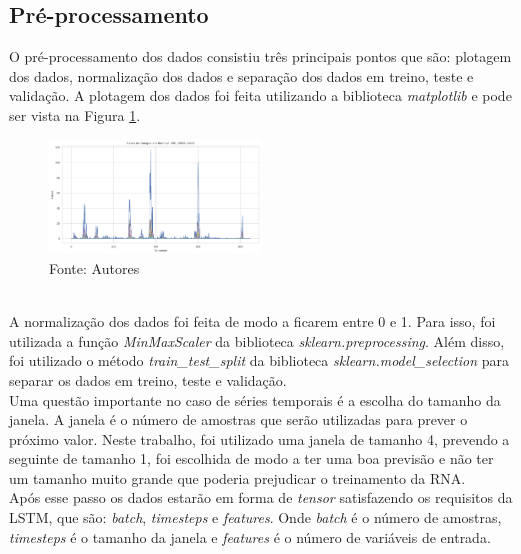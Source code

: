 \documentclass[
	article,			%
	12pt,				%
	a4paper,			%
	chapter=TITLE,		%
	section=TITLE,		%
	subsection=TITLE,	%
	subsubsection=TITLE %
	english,			%
	brazil,				%
	sumario=tradicional
	]{abntex2}
\begin{document}
\subsection{Pré-processamento}
O pré-processamento dos dados consistiu três principais pontos que são: plotagem dos dados, normalização dos dados e separação dos dados em treino, teste e validação. 
A plotagem dos dados foi feita utilizando a biblioteca \textit{matplotlib} e pode ser vista na Figura \ref{figure2}.
\begin{figure}[htbp]
	\centering
	\includegraphics[width=0.5\textwidth]{imagens/imgCodigos/casosTotaisBambui20082023.png}
	\caption{Fonte: Autores}
	\label{figure2}
\end{figure}
\\ \indent
A normalização dos dados foi feita de modo a ficarem entre 0 e 1. Para isso, foi utilizada a função \textit{MinMaxScaler} da biblioteca \textit{sklearn.preprocessing}. Além disso, foi utilizado o método \textit{train\_test\_split} da biblioteca \textit{sklearn.model\_selection} para separar os dados em treino, teste e validação.
\\ \indent
Uma questão importante no caso de séries temporais é a escolha do tamanho da janela. A janela é o número de amostras que serão utilizadas para prever o próximo valor. Neste trabalho, foi utilizado uma janela de tamanho 4, prevendo a seguinte de tamanho 1, foi escolhida de modo a ter uma boa previsão e não ter um tamanho muito grande que poderia prejudicar o treinamento da RNA.
\\ \indent 
Após esse passo os dados estarão em forma de \textit{tensor} satisfazendo os requisitos da LSTM, que são: \textit{batch}, \textit{timesteps} e \textit{features}. Onde \textit{batch} é o número de amostras, \textit{timesteps} é o tamanho da janela e \textit{features} é o número de variáveis de entrada. 
\end{document}
